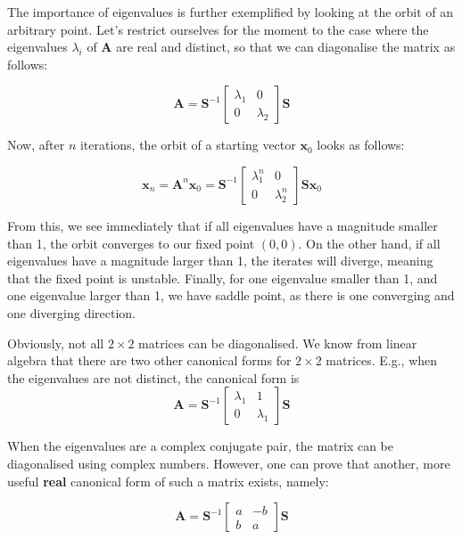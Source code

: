 The importance of eigenvalues is further exemplified by looking at the orbit of an arbitrary point. Let's restrict ourselves for the moment to the case where the eigenvalues $\lambda_i$ of ${\mathbf A}$ are real and distinct, so that we can diagonalise the matrix as follows:

\begin{equation}
{\mathbf A} = {\mathbf S}^{-1}
\begin{bmatrix}
\lambda_{1} & 0 \\
0 & \lambda_{2}
\end{bmatrix} 
{\mathbf S}
\end{equation} 

Now, after $n$ iterations, the orbit of a starting vector ${\mathbf x}_0$ looks as follows:

\begin{equation}
{\mathbf x}_n = {\mathbf A}^n {\mathbf x}_0 = {\mathbf S}^{-1}
\begin{bmatrix}
\lambda_1^n & 0 \\
0 & \lambda_2^n
\end{bmatrix} 
{\mathbf S} {\mathbf x}_0 
\end{equation} 

From this, we see immediately that if all eigenvalues have a magnitude smaller than 1, the orbit converges to our fixed point $(0,0)$. On the other hand, if all eigenvalues have a magnitude larger than 1, the iterates will diverge, meaning that the fixed point is unstable. Finally, for one eigenvalue smaller than 1, and one eigenvalue larger than 1, we have saddle point, as there is one converging and one diverging direction.

Obviously, not all $2 \times 2$ matrices can be diagonalised. We know from linear algebra that there are two other canonical forms for $2 \times 2$ matrices. E.g., when the eigenvalues are not distinct, the canonical form is
\begin{equation}
{\mathbf A} = 
{\mathbf S}^{-1}
\begin{bmatrix}
\lambda_1 & 1 \\
0 & \lambda_1
\end{bmatrix} 
{\mathbf S}
\end{equation} 

When the eigenvalues are a complex conjugate pair, the matrix can be diagonalised using complex numbers. However, one can prove that another, more useful \textbf{real} canonical form of such a matrix exists, namely:

\begin{equation}
{\mathbf A} = 
{\mathbf S}^{-1}
\begin{bmatrix}
a & -b \\
b & a
\end{bmatrix} 
{\mathbf S}
\end{equation} 


